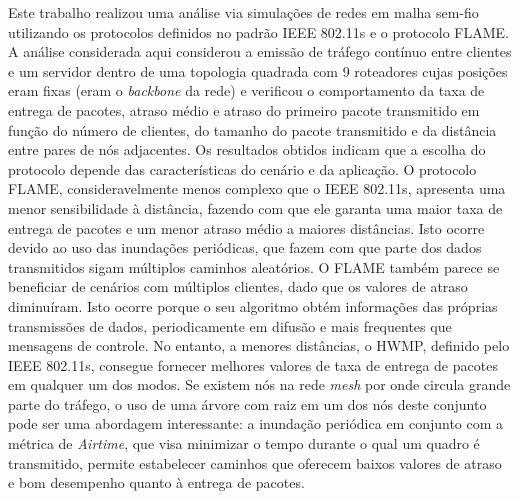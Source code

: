 \documentclass[letterpaper, 10 pt, conference]{ieeeconf}  %
\begin{document}
Este trabalho realizou uma análise via simulações de redes em malha sem-fio utilizando os protocolos definidos no padrão IEEE 802.11s e o protocolo FLAME. A análise considerada aqui considerou a emissão de tráfego contínuo entre clientes e um servidor dentro de uma topologia quadrada com 9 roteadores cujas posições eram fixas (eram o \textit{backbone} da rede) e verificou o comportamento da taxa de entrega de pacotes, atraso médio e atraso do primeiro pacote transmitido em função do número de clientes, do tamanho do pacote transmitido e da distância entre pares de nós adjacentes. Os resultados obtidos indicam que a escolha do protocolo depende das características do cenário e da aplicação. O protocolo FLAME, consideravelmente menos complexo que o IEEE 802.11s, apresenta uma menor sensibilidade à distância, fazendo com que ele garanta uma maior taxa de entrega de pacotes e um menor atraso médio a maiores distâncias. Isto ocorre devido ao uso das inundações periódicas, que fazem com que parte dos dados transmitidos sigam múltiplos caminhos aleatórios. O FLAME também parece se beneficiar de cenários com múltiplos clientes, dado que os valores de atraso diminuíram. Isto ocorre porque o seu algoritmo obtém informações das próprias transmissões de dados, periodicamente em difusão e mais frequentes que mensagens de controle. No entanto, a menores distâncias, o HWMP, definido pelo IEEE 802.11s, consegue fornecer melhores valores de taxa de entrega de pacotes em qualquer um dos modos. Se existem nós na rede \textit{mesh} por onde circula grande parte do tráfego, o uso de uma árvore com raiz em um dos nós deste conjunto pode ser uma abordagem interessante: a inundação periódica em conjunto com a métrica de \textit{Airtime}, que visa minimizar o tempo durante o qual um quadro é transmitido, permite estabelecer caminhos que oferecem baixos valores de atraso e bom desempenho quanto à entrega de pacotes.



\end{document}
